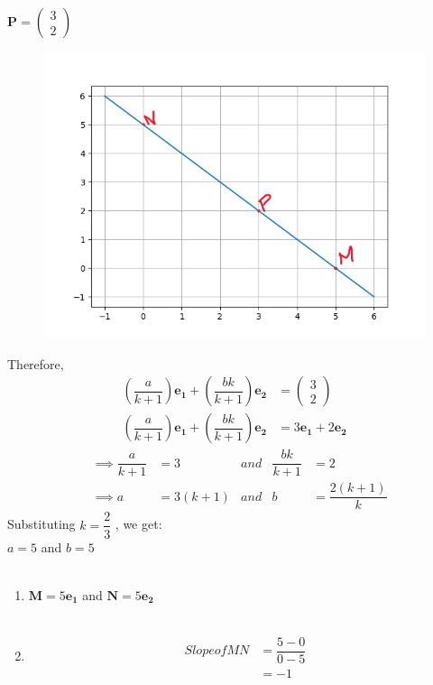 \documentclass[journal,12pt,twocolumn]{IEEEtran}
\theoremstyle{remark}
\newcommand{\myvec}[1]{\ensuremath{\begin{pmatrix}#1\end{pmatrix}}}
\numberwithin{equation}{subsection}
\let\vec\mathbf
\begin{document}
 $ \vec{P} = \myvec{3 \\ 2}$\\
\begin{figure}[h]
\centering  
\includegraphics[width=\columnwidth]{figures/Figure_1.png} 
\end{figure}
Therefore,
\begin{align}
 \left( \dfrac{a}{k+1}\right) \vec{e_1}+\left( \dfrac{bk}{k+1}\right) \vec{e_2} &= \myvec{3 \\ 2}\\
 \left( \dfrac{a}{k+1}\right) \vec{e_1}+\left( \dfrac{bk}{k+1}\right) \vec{e_2} &= 3\vec{e_1}+2\vec{e_2}
\end{align}
\begin{align}
  &\implies \dfrac{a}{k+1} &= 3 &and &\dfrac{bk}{k+1} &= 2 \\
  &\implies a &= 3(k+1)  &and &b &= \dfrac{2(k+1)}{k}
\end{align}   
Substituting $k = \dfrac{2}{3}$ , we get:\\
   $a = 5$ and $b = 5$\\\\
\begin{enumerate}
\item$\vec{M} = 5\vec{e_1}$ and $\vec{N} = 5\vec{e_2}$\\\\
\item \begin{align}
      Slope of MN &= \dfrac{5-0}{0-5}\\
                  &= -1
      \end{align}
\end{enumerate}                  
\end{document}
